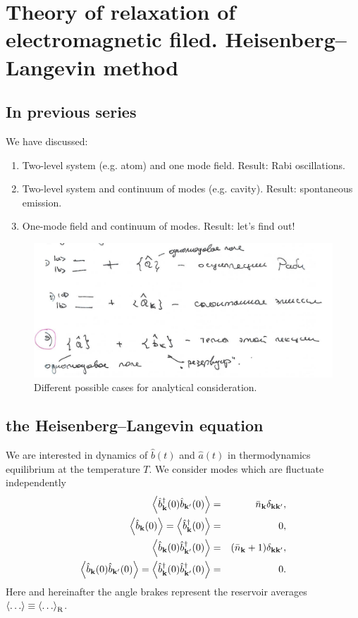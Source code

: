 \section{Theory of relaxation of electromagnetic filed. Heisenberg--Langevin method}

\subsection{In previous series}

We have discussed:
\begin{enumerate}
	\item Two-level system (e.g. atom) and one mode field. Result: Rabi oscillations.
	\item Two-level system and continuum of modes (e.g. cavity). Result: spontaneous emission.
	\item One-mode field and continuum of modes. Result: let's find out!
\end{enumerate}

\begin{figure}[h!]
	\centering
	\includegraphics[width=0.8\linewidth]{fig/L9/fig1}
	\caption{Different possible cases for analytical consideration.}
	\label{fig:fig11}
\end{figure}

\subsection{the Heisenberg--Langevin equation}

We are interested in dynamics of $\hat{b}(t)$ and $\hat{a}(t)$ in thermodynamics equilibrium at the temperature $T$. We consider modes which are fluctuate independently
\begin{eqnarray}
	\left \langle \hat{b}^{\dagger}_{\mathbf{k}} (0) \hat{b}_{\mathbf{k}'} (0) \right \rangle &=& \bar{n}_{\mathbf{k}} \delta_{\mathbf{k}\mathbf{k}'}, \\
	\left\langle {\hat{b}_{\mathbf{k}}(0)} \right\rangle = \left\langle {\hat{b}^{\dagger}_{\mathbf{k}}(0)} \right\rangle &=& 0,\\
	\left\langle {\hat{b}_{\mathbf{k}} (0) \hat{b}^{\dagger}_{\mathbf{k}'} (0) } \right\rangle &=& (\bar{n}_{\mathbf{k}}+1) \delta_{\mathbf{k}\mathbf{k}'}, \\
	\left\langle {\hat{b}_{\mathbf{k}} (0) \hat{b}_{\mathbf{k}'} (0) } \right\rangle = \left\langle {\hat{b}^{\dagger}_{\mathbf{k}} (0) \hat{b}^{\dagger}_{\mathbf{k}'} (0) } \right\rangle &=& 0.
\end{eqnarray}
Here and  hereinafter the angle brakes represent the reservoir averages $\left\langle {\dots} \right\rangle \equiv \left\langle {\dots} \right\rangle_{\text{R}}$.

